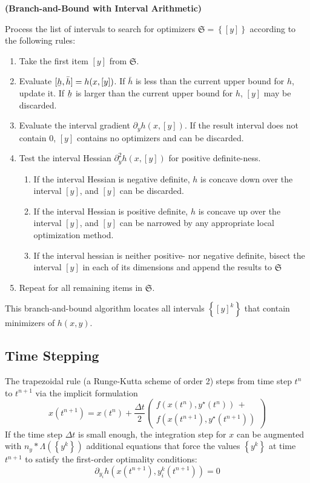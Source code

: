 \documentclass[twoside,leqno,twocolumn]{article}
\newcommand{\frS}{\ensuremath{\mathfrak{S}}}
\newcommand\ubar[1]{\underaccent{\bar}{#1}}
\begin{document}
\begin{algorithm}
	\label{algo:bnb-ia}
	\textbf{(Branch-and-Bound with Interval Arithmetic)}
	
	Process the list of intervals to search for optimizers $\frS = \left\{[y]\right\}$ according to the following rules:
	\begin{enumerate} 
		\item Take the first item $[y]$ from $\frS$.
		\item Evaluate $[\ubar h, \bar h] = h(x, [y])$. If $\bar h$ is less than the current upper bound for $h$, update it. If $\ubar h$ is larger than the current upper bound for $h$, $[y]$ may be discarded.
		\item Evaluate the interval gradient $\partial_y h(x, [y])$. If the result interval does not contain $0$, $[y]$ contains no optimizers and can be discarded.
		\item Test the interval Hessian $\partial^2_y h(x, [y])$ for positive definite-ness.
		\begin{enumerate}
			\item If the interval Hessian is negative definite, $h$ is concave down over the interval $[y]$, and $[y]$ can be discarded.
			\item If the interval Hessian is positive definite, $h$ is concave up over the interval $[y]$, and $[y]$ can be narrowed by any appropriate local optimization method.
			\item If the interval hessian is neither positive- nor negative definite, bisect the interval $[y]$ in each of its dimensions and append the results to $\frS$
		\end{enumerate}
		\item Repeat for all remaining items in $\frS$.
	\end{enumerate}
\end{algorithm}
This branch-and-bound algorithm locates all intervals $\left\{[y]^k\right\}$ that contain minimizers of $h(x, y)$.

\subsection{Time Stepping}
The trapezoidal rule (a Runge-Kutta scheme of order 2) steps from time step $t^n$ to $t^{n+1}$ via the implicit formulation
\begin{equation}
	\label{eq:trap-rule}
	x(t^{n+1}) = x(t^n) + \frac{\Delta t}{2}\left(\begin{split}f\left(x(t^n), y^\star(t^n)\right)\, + \\ f\left(x(t^{n+1}), y^\star(t^{n+1})\right) \end{split}\right)
\end{equation}
If the time step $\Delta t$ is small enough, the integration step for $x$ can be augmented with $n_y * \Lambda\left(\left\{y^k\right\}\right)$ additional equations that force the values $\left\{y^k\right\}$ at time $t^{n+1}$ to satisfy the first-order optimality conditions:
\begin{equation}
	\label{eq:first-order-opt-at-tn}
	\partial_{y_i}h\left(x(t^{n+1}), y^k_i(t^{n+1})\right) = 0
\end{equation}
\end{document}
